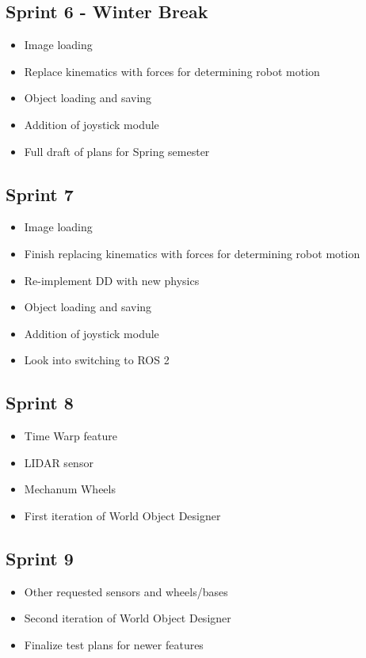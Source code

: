 \subsection{Sprint 6 - Winter Break}
\begin{itemize}
	\item Image loading
	\item Replace kinematics with forces for determining robot motion
 	\item Object loading and saving
 	\item Addition of joystick module
 	\item Full draft of plans for Spring semester
\end{itemize}

\subsection{Sprint 7}
\begin{itemize}
	\item Image loading
	\item Finish replacing kinematics with forces for determining robot motion
	\item Re-implement DD with new physics
 	\item Object loading and saving
 	\item Addition of joystick module
 	\item Look into switching to ROS 2
\end{itemize}

\subsection{Sprint 8}
\begin{itemize}
	\item Time Warp feature
	\item LIDAR sensor
	\item Mechanum Wheels
	\item First iteration of World Object Designer
\end{itemize}

\subsection{Sprint 9}
\begin{itemize}
	\item Other requested sensors and wheels/bases
	\item Second iteration of World Object Designer
	\item Finalize test plans for newer features
\end{itemize}

